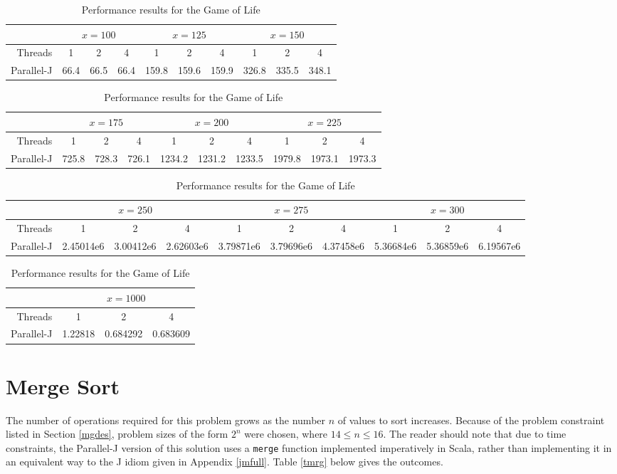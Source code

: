 \begin{table}[htbp]
\begin{tabular}{|r||c|c|c||c|c|c||c|c|c||}
	\hline
		& \multicolumn{3}{|c|}{$x=100$} & \multicolumn{3}{|c|}{$x=125$} & \multicolumn{3}{|c|}{$x=150$} \\
	\hline
		Threads & 1 & 2 & 4 & 1 & 2 & 4 & 1 & 2 & 4 \\
	\hline
	\hline
		Parallel-J & 66.4 & 66.5 & 66.4 & 159.8 & 159.6 & 159.9 & 326.8 & 335.5 & 348.1 \\
	\hline
\end{tabular}
\begin{tabular}{|r||c|c|c||c|c|c||c|c|c||}
	\hline
		& \multicolumn{3}{|c|}{$x=175$} & \multicolumn{3}{|c|}{$x=200$} & \multicolumn{3}{|c|}{$x=225$} \\
	\hline
		Threads & 1 & 2 & 4 & 1 & 2 & 4 & 1 & 2 & 4 \\
	\hline
	\hline
		Parallel-J & 725.8 & 728.3 & 726.1 & 1234.2 & 1231.2 & 1233.5 & 1979.8 & 1973.1 & 1973.3 \\
	\hline
\end{tabular}
\begin{tabular}{|r||c|c|c||c|c|c||c|c|c||}
	\hline
		& \multicolumn{3}{|c|}{$x=250$} & \multicolumn{3}{|c|}{$x=275$} & \multicolumn{3}{|c|}{$x=300$} \\
	\hline
		Threads & 1 & 2 & 4 & 1 & 2 & 4 & 1 & 2 & 4 \\
	\hline
	\hline
		Parallel-J & 2.45014e6 & 3.00412e6 & 2.62603e6 & 3.79871e6 & 3.79696e6 & 4.37458e6 & 5.36684e6 & 5.36859e6 & 6.19567e6 \\
	\hline
\end{tabular}
\begin{tabular}{|r||c|c|c||}
	\hline
		& \multicolumn{3}{|c|}{$x=1000$} \\
	\hline
		Threads & 1 & 2 & 4 \\
	\hline
	\hline
		Parallel-J & 1.22818 & 0.684292 & 0.683609 \\
	\hline
\end{tabular}
\caption{Performance results for the Game of Life}
\label{tgol}
\end{table}

\section{Merge Sort}
The number of operations required for this problem 
grows as the number $n$ of values to sort increases. 
Because of the problem constraint listed in Section \ref{mgdes}, 
problem sizes of the form $2^n$ were chosen, 
where $14 \le n \le 16$. 
The reader should note that due to time constraints, 
the Parallel-J version of this solution uses a \texttt{merge} function 
implemented imperatively in Scala, rather than 
implementing it in an equivalent way to the J idiom given in Appendix \ref{jmfull}.
Table \ref{tmrg} below gives the outcomes.

